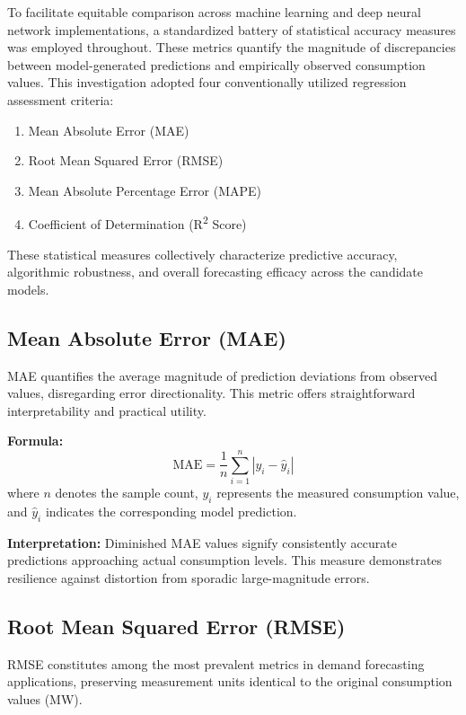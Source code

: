 \documentclass[oneside, 12pt]{book}
\numberwithin{equation}{chapter}
\newcommand{\sizexii}{\fontsize{12pt}{6pt}\selectfont}
\begin{document}
To facilitate equitable comparison across machine learning and deep neural network implementations, a standardized battery of statistical accuracy measures was employed throughout. These metrics quantify the magnitude of discrepancies between model-generated predictions and empirically observed consumption values. This investigation adopted four conventionally utilized regression assessment criteria:
\begin{enumerate}
    \item Mean Absolute Error (MAE)
    \item Root Mean Squared Error (RMSE)
    \item Mean Absolute Percentage Error (MAPE)
    \item Coefficient of Determination (R\textsuperscript{2} Score)
\end{enumerate}

These statistical measures collectively characterize predictive accuracy, algorithmic robustness, and overall forecasting efficacy across the candidate models.

\subsection{\sizexii Mean Absolute Error (MAE)}

MAE quantifies the average magnitude of prediction deviations from observed values, disregarding error directionality. This metric offers straightforward interpretability and practical utility.

\textbf{Formula:}
\begin{equation}
\text{MAE} = \frac{1}{n} \sum_{i=1}^{n} |y_i - \hat{y}_i|
\end{equation}
where $n$ denotes the sample count, $y_i$ represents the measured consumption value, and $\hat{y}_i$ indicates the corresponding model prediction.

\textbf{Interpretation:} Diminished MAE values signify consistently accurate predictions approaching actual consumption levels. This measure demonstrates resilience against distortion from sporadic large-magnitude errors.

\subsection{\sizexii Root Mean Squared Error (RMSE)}

RMSE constitutes among the most prevalent metrics in demand forecasting applications, preserving measurement units identical to the original consumption values (MW).
\end{document}
